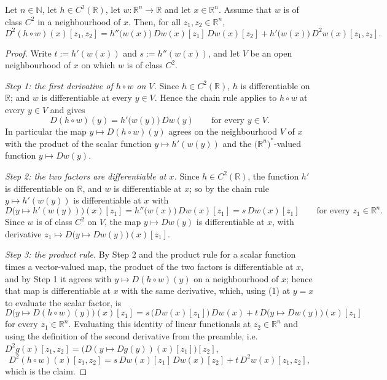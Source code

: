 \begin{lemma}
Let $n\in\mathbb{N}$, let $h\in C^2(\mathbb{R})$, let $w:\mathbb{R}^n\to\mathbb{R}$ and let
$x\in\mathbb{R}^n$. Assume that $w$ is of class $C^2$ in a neighbourhood of $x$. Then, for all
$z_1,z_2\in\mathbb{R}^n$,
$$D^2(h\circ w)(x)[z_1,z_2]=h''\big(w(x)\big)\,Dw(x)[z_1]\,Dw(x)[z_2]
+h'\big(w(x)\big)\,D^2w(x)[z_1,z_2].$$
\end{lemma}
\begin{proof}
Write $t:=h'(w(x))$ and $s:=h''(w(x))$, and let $V$ be an open neighbourhood of $x$ on which $w$ is
of class $C^2$.

\emph{Step 1: the first derivative of $h\circ w$ on $V$.} Since $h\in C^2(\mathbb{R})$, $h$ is
differentiable on $\mathbb{R}$; and $w$ is differentiable at every $y\in V$. Hence the chain rule
applies to $h\circ w$ at every $y\in V$ and gives
\begin{equation*}D(h\circ w)(y)=h'\big(w(y)\big)\,Dw(y)\qquad\text{for every }y\in V. \tag{1}\end{equation*}
In particular the map $y\mapsto D(h\circ w)(y)$ agrees on the neighbourhood $V$ of $x$ with the
product of the scalar function $y\mapsto h'(w(y))$ and the $\big(\mathbb{R}^n\big)^*$-valued
function $y\mapsto Dw(y)$.

\emph{Step 2: the two factors are differentiable at $x$.} Since $h\in C^2(\mathbb{R})$, the
function $h'$ is differentiable on $\mathbb{R}$, and $w$ is differentiable at $x$; so by the chain
rule $y\mapsto h'(w(y))$ is differentiable at $x$ with
$$D\big(y\mapsto h'(w(y))\big)(x)[z_1]=h''\big(w(x)\big)\,Dw(x)[z_1]=s\,Dw(x)[z_1]
\qquad\text{for every }z_1\in\mathbb{R}^n .$$
Since $w$ is of class $C^2$ on $V$, the map $y\mapsto Dw(y)$ is differentiable at $x$, with
derivative $z_1\mapsto D\big(y\mapsto Dw(y)\big)(x)[z_1]$.

\emph{Step 3: the product rule.} By Step 2 and the product rule for a scalar function times a
vector-valued map, the product of the two factors is differentiable at $x$, and by Step 1 it agrees
with $y\mapsto D(h\circ w)(y)$ on a neighbourhood of $x$; hence that map is differentiable at $x$
with the same derivative, which, using (1) at $y=x$ to evaluate the scalar factor, is
$$D\big(y\mapsto D(h\circ w)(y)\big)(x)[z_1]
=s\,\big(Dw(x)[z_1]\big)\,Dw(x)+t\,D\big(y\mapsto Dw(y)\big)(x)[z_1]$$
for every $z_1\in\mathbb{R}^n$. Evaluating this identity of linear functionals at
$z_2\in\mathbb{R}^n$ and using the definition of the second derivative from the preamble, i.e.\
$D^2g(x)[z_1,z_2]=\big(D(y\mapsto Dg(y))(x)[z_1]\big)[z_2]$,
$$D^2(h\circ w)(x)[z_1,z_2]=s\,Dw(x)[z_1]\,Dw(x)[z_2]+t\,D^2w(x)[z_1,z_2],$$
which is the claim.
\end{proof}
